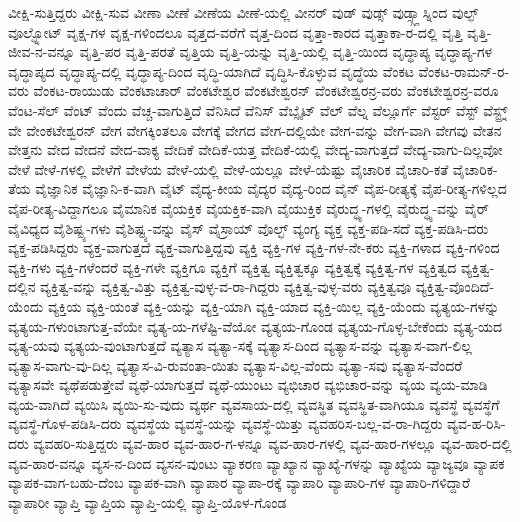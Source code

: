 {ವೀಕ್ಷಿ-ಸುತ್ತಿದ್ದರು
ವೀಕ್ಷಿ-ಸುವ
ವೀಣಾ
ವೀಣೆ
ವೀಣೆಯ
ವೀಣೆ-ಯಲ್ಲಿ
ವೀನರ್
ವುಡ್
ವುಡ್ಸ್
ವುಡ್ಸ್ಗ್ಲಾಸ್ನಿಂದ
ವುಲ್ಫ್
ವೂಲ್ಫ್ನೋಟ್
ವೃಕ್ಷ-ಗಳ
ವೃಕ್ಷ-ಗಳಿಂದಲೂ
ವೃತ್ತದ-ವರೆಗೆ
ವೃತ್ತ-ದಿಂದ
ವೃತ್ತಾ-ಕಾರದ
ವೃತ್ತಾಕಾ-ರ-ದಲ್ಲಿ
ವೃತ್ತಿ
ವೃತ್ತಿ-ಜೀವ-ನ-ವನ್ನೂ
ವೃತ್ತಿ-ಪರ
ವೃತ್ತಿ-ಪರತೆ
ವೃತ್ತಿಯ
ವೃತ್ತಿ-ಯನ್ನು
ವೃತ್ತಿ-ಯಲ್ಲಿ
ವೃತ್ತಿ-ಯಿಂದ
ವೃದ್ಧಾಪ್ಯ
ವೃದ್ಧಾಪ್ಯ-ಗಳ
ವೃದ್ಧಾಪ್ಯದ
ವೃದ್ಧಾಪ್ಯ-ದಲ್ಲಿ
ವೃದ್ಧಾಪ್ಯ-ದಿಂದ
ವೃದ್ಧಿ-ಯಾಗಿದೆ
ವೃದ್ಧಿಸಿ-ಕೊಳ್ಳುವ
ವೃದ್ಧೆಯ
ವೆಂಕಟ
ವೆಂಕಟ-ರಾಮನ್-ರ-ವರು
ವೆಂಕಟ-ರಾಯುಡು
ವೆಂಕಟಾಚಾರ್
ವೆಂಕಟೇಶ್ವರ
ವೆಂಕಟೇಶ್ವರನ್
ವೆಂಕಟೇಶ್ವರನ್ರ-ವರು
ವೆಂಕಟೇಶ್ವರನ್ರ-ವರೂ
ವೆಂಟ-ಸೆಲ್
ವೆಂಟ್
ವೆಂದು
ವೆಚ್ಚ-ವಾಗುತ್ತಿದೆ
ವೆನಿಸಿದೆ
ವೆನಿಸ್
ವೆಬ್ಸೈಟ್
ವೆಲ್
ವೆಲ್ನ
ವೆಲ್ಲೂರ್ಗೆ
ವೆಸ್ಟರ್
ವೆಸ್ಟ್
ವೆಸ್ಟ್ರ್ನ್
ವೇ
ವೇಂಕಟೇಶ್ವರನ್
ವೇಗ
ವೇಗಕ್ಕಿಂತಲೂ
ವೇಗಕ್ಕೆ
ವೇಗದ
ವೇಗ-ದಲ್ಲಿಯೇ
ವೇಗ-ವನ್ನು
ವೇಗ-ವಾಗಿ
ವೇಗವು
ವೇತನ
ವೇತ್ತನು
ವೇದ
ವೇದನೆ
ವೇದ-ವಾಕ್ಯ
ವೇದಿಕೆ
ವೇದಿಕೆ-ಯತ್ತ
ವೇದಿಕೆ-ಯಲ್ಲಿ
ವೇದ್ಯ-ವಾಗುತ್ತದೆ
ವೇದ್ಯ-ವಾಗು-ದಿಲ್ಲವೋ
ವೇಳೆ
ವೇಳೆ-ಗಳಲ್ಲಿ
ವೇಳೆಗೆ
ವೇಳೆಯ
ವೇಳೆ-ಯಲ್ಲಿ
ವೇಳೆ-ಯಲ್ಲೂ
ವೇಳೆ-ಯೆಷ್ಟು
ವೈಚಾರಿಕ
ವೈಚಾರಿ-ಕತೆ
ವೈಚಾರಿಕ-ತೆಯ
ವೈಜ್ಞಾನಿಕ
ವೈಜ್ಞಾನಿ-ಕ-ವಾಗಿ
ವೈಟ್
ವೈದ್ಯ-ಕೀಯ
ವೈದ್ಯರ
ವೈದ್ಯ-ರಿಂದ
ವೈನ್
ವೈಪ-ರೀತ್ಯಕ್ಕೆ
ವೈಪ-ರೀತ್ಯ-ಗಳಿಲ್ಲದ
ವೈಪ-ರೀತ್ಯ-ವಿದ್ದಾಗಲೂ
ವೈಮಾನಿಕ
ವೈಯಕ್ತಿಕ
ವೈಯಕ್ತಿಕ-ವಾಗಿ
ವೈಯುಕ್ತಿಕ
ವೈರುದ್ಧ್ಯ-ಗಳಲ್ಲಿ
ವೈರುದ್ಧ್ಯ-ವನ್ನು
ವೈರ್
ವೈವಿಧ್ಯದ
ವೈಶಿಷ್ಟ್ಯ-ಗಳು
ವೈಶಿಷ್ಟ್ಯ-ವನ್ನು
ವೈಸ್
ವೈಸ್ರಾಯ್
ವೊಲ್ಛ್
ವ್ಯಂಗ್ಯ
ವ್ಯಕ್ತ
ವ್ಯಕ್ತ-ಪಡಿ-ಸದೆ
ವ್ಯಕ್ತ-ಪಡಿಸಿ-ದರು
ವ್ಯಕ್ತ-ಪಡಿಸಿದ್ದರು
ವ್ಯಕ್ತ-ವಾಗುತ್ತದೆ
ವ್ಯಕ್ತ-ವಾಗುತ್ತಿದ್ದವು
ವ್ಯಕ್ತಿ
ವ್ಯಕ್ತಿ-ಗಳ
ವ್ಯಕ್ತಿ-ಗಳ-ನೇ-ಕರು
ವ್ಯಕ್ತಿ-ಗಳಾದ
ವ್ಯಕ್ತಿ-ಗಳಿಂದ
ವ್ಯಕ್ತಿ-ಗಳು
ವ್ಯಕ್ತಿ-ಗಳೆಂದರೆ
ವ್ಯಕ್ತಿ-ಗಳೇ
ವ್ಯಕ್ತಿಗೂ
ವ್ಯಕ್ತಿಗೆ
ವ್ಯಕ್ತಿತ್ವ
ವ್ಯಕ್ತಿತ್ವಕ್ಕೂ
ವ್ಯಕ್ತಿತ್ವಕ್ಕೆ
ವ್ಯಕ್ತಿತ್ವ-ಗಳ
ವ್ಯಕ್ತಿತ್ವದ
ವ್ಯಕ್ತಿತ್ವ-ದಲ್ಲಿನ
ವ್ಯಕ್ತಿತ್ವ-ವನ್ನು
ವ್ಯಕ್ತಿತ್ವ-ವಿತ್ತು
ವ್ಯಕ್ತಿತ್ವ-ವುಳ್ಳ-ವ-ರಾ-ಗಿದ್ದರು
ವ್ಯಕ್ತಿತ್ವ-ವುಳ್ಳ-ವರು
ವ್ಯಕ್ತಿತ್ವವೂ
ವ್ಯಕ್ತಿತ್ವ-ವೊಂದಿದೆ-ಯೆಂದು
ವ್ಯಕ್ತಿಯ
ವ್ಯಕ್ತಿ-ಯಂತೆ
ವ್ಯಕ್ತಿ-ಯನ್ನು
ವ್ಯಕ್ತಿ-ಯಾಗಿ
ವ್ಯಕ್ತಿ-ಯಾದ
ವ್ಯಕ್ತಿ-ಯಿಲ್ಲ
ವ್ಯಕ್ತಿ-ಯೆಂದು
ವ್ಯತ್ಯಯ-ಗಳನ್ನು
ವ್ಯತ್ಯಯ-ಗಳುಂಟಾಗುತ್ತ-ವೆಯೇ
ವ್ಯತ್ಯ-ಯ-ಗಳೆಷ್ಟಿ-ವೆಯೋ
ವ್ಯತ್ಯಯ-ಗೊಂಡ
ವ್ಯತ್ಯಯ-ಗೊಳ್ಳ-ಬೇಕೆಂದು
ವ್ಯತ್ಯ-ಯದ
ವ್ಯತ್ಯ-ಯವು
ವ್ಯತ್ಯಯ-ವುಂಟಾಗುತ್ತದೆ
ವ್ಯತ್ಯಾಸ
ವ್ಯತ್ಯಾ-ಸಕ್ಕೆ
ವ್ಯತ್ಯಾಸ-ದಿಂದ
ವ್ಯತ್ಯಾಸ-ವನ್ನು
ವ್ಯತ್ಯಾಸ-ವಾಗ-ಲಿಲ್ಲ
ವ್ಯತ್ಯಾಸ-ವಾಗು-ವು-ದಿಲ್ಲ
ವ್ಯತ್ಯಾಸ-ವಿ-ರುವಂತಾ-ಯಿತು
ವ್ಯತ್ಯಾಸ-ವಿಲ್ಲ-ವೆಂದು
ವ್ಯತ್ಯಾ-ಸವು
ವ್ಯತ್ಯಾಸ-ವೆಂದರೆ
ವ್ಯತ್ಯಾಸವೇ
ವ್ಯಥೆಪಡುತ್ತೇವೆ
ವ್ಯಥೆ-ಯಾಗುತ್ತದೆ
ವ್ಯಥೆ-ಯುಂಟು
ವ್ಯಭಿಚಾರ
ವ್ಯಭಿಚಾರ-ವನ್ನು
ವ್ಯಯ
ವ್ಯಯ-ಮಾಡಿ
ವ್ಯಯ-ವಾಗಿದೆ
ವ್ಯಯಿಸಿ
ವ್ಯಯಿ-ಸು-ವುದು
ವ್ಯರ್ಥ
ವ್ಯವಸಾಯ-ದಲ್ಲಿ
ವ್ಯವಸ್ಥಿತ
ವ್ಯವಸ್ಥಿತ-ವಾಗಿಯೂ
ವ್ಯವಸ್ಥೆ
ವ್ಯವಸ್ಥೆಗೆ
ವ್ಯವಸ್ಥೆ-ಗೊಳ-ಪಡಿಸಿ-ದರು
ವ್ಯವಸ್ಥೆಯ
ವ್ಯವಸ್ಥೆ-ಯನ್ನು
ವ್ಯವಸ್ಥೆ-ಯಿತ್ತು
ವ್ಯವಹರಿಸ-ಬಲ್ಲ-ವ-ರಾ-ಗಿದ್ದರು
ವ್ಯವ-ಹ-ರಿಸಿ-ದರು
ವ್ಯವಹರಿ-ಸುತ್ತಿದ್ದರು
ವ್ಯವ-ಹಾರ
ವ್ಯವ-ಹಾರ-ಗ-ಳನ್ನೂ
ವ್ಯವ-ಹಾರ-ಗಳಲ್ಲಿ
ವ್ಯವ-ಹಾರ-ಗಳಲ್ಲೂ
ವ್ಯವ-ಹಾರ-ದಲ್ಲಿ
ವ್ಯವ-ಹಾರ-ವನ್ನೂ
ವ್ಯಸ-ನ-ದಿಂದ
ವ್ಯಸನ-ವುಂಟು
ವ್ಯಾಕರಣ
ವ್ಯಾಖ್ಯಾನ
ವ್ಯಾಖ್ಯೆ-ಗಳನ್ನು
ವ್ಯಾಖ್ಯೆಯ
ವ್ಯಾಜ್ಯವೂ
ವ್ಯಾಪಕ
ವ್ಯಾಪಕ-ವಾಗ-ಬಹು-ದೆಂಬ
ವ್ಯಾಪಕ-ವಾಗಿ
ವ್ಯಾಪಾರ
ವ್ಯಾಪಾ-ರಕ್ಕೆ
ವ್ಯಾಪಾರಿ
ವ್ಯಾಪಾರಿ-ಗಳ
ವ್ಯಾಪಾರಿ-ಗಳಿದ್ದಾರೆ
ವ್ಯಾಪಾರೀ
ವ್ಯಾಪ್ತಿ
ವ್ಯಾಪ್ತಿಯ
ವ್ಯಾಪ್ತಿ-ಯಲ್ಲಿ
ವ್ಯಾಪ್ತಿ-ಯೊಳ-ಗೊಂಡ
}
